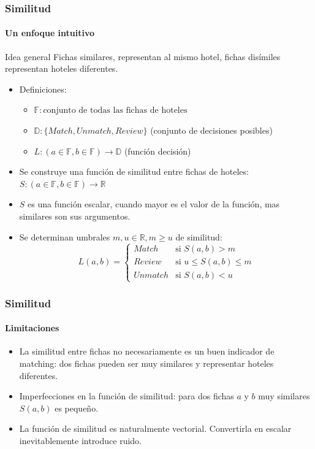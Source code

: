 \documentclass{beamer}
\begin{document}
\begin{frame}
	\frametitle{Similitud}
	\framesubtitle{Un enfoque intuitivo}
		\begin{block}{Idea general}
	Fichas similares, representan al mismo hotel, fichas disímiles representan hoteles diferentes.
	  \end{block}
	\begin{itemize}
	  \item Definiciones:
	  \begin{itemize}
	    \item 
			$\mathbb{F}: \text{conjunto de todas las fichas de hoteles}$ \\
			\item
      $\mathbb{D}: \{Match, Unmatch, Review\}$ (conjunto de decisiones posibles)\\
      \item
      $L:(a \in \mathbb{F}, b \in \mathbb{F}) \rightarrow  \mathbb{D}$ (función decisión)
    \end{itemize} 
		\item Se construye una función de similitud entre fichas de hoteles: 
      $S:(a \in \mathbb{F}, b \in \mathbb{F}) \rightarrow  \mathbb{R}$ \\
		\item $S$ es una función escalar, cuando mayor es el valor de la función, mas similares son sus argumentos.
		\item Se determinan umbrales $m, u \in \mathbb{R}, m\geq u$ de similitud:
	\small	
$$
L(a,b) =
\begin{cases}
Match & \text{si }S(a,b)>m \\
Review & \text{si }u\leq S(a,b)\leq m \\
Unmatch & \text{si }S(a,b)<u
\end{cases}
$$
\end{itemize}
\end{frame}

\begin{frame}
	\frametitle{Similitud}
	\framesubtitle{Limitaciones}
	\begin{itemize}
		\item La similitud entre fichas no necesariamente es un buen indicador de matching: dos fichas pueden ser muy similares y representar hoteles diferentes.
		\item Imperfecciones en la función de similitud: para dos fichas $a$ y $b$ muy similares $S(a, b)$ es pequeño.
		\item La función de similitud es naturalmente vectorial. Convertirla en escalar inevitablemente introduce ruido.
\end{itemize}
\end{frame}
  
\end{document}
